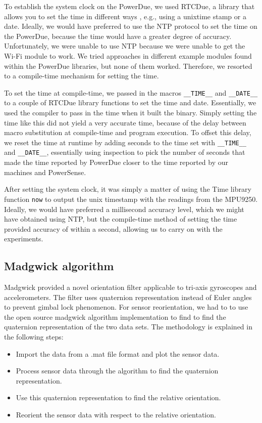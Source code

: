 \documentclass[journal]{IEEEtranTIE}
\begin{document}
To establish the system clock on the PowerDue, we used RTCDue, a library that
allows you to set the time in different ways \cite{RTCDue}, e.g., using a
unixtime stamp or a date. Ideally, we would have preferred to use the NTP
protocol to set the time on the PowerDue, because the time would have a greater
degree of accuracy. Unfortunately, we were unable to use NTP because we were
unable to get the Wi-Fi module to work. We tried approaches in different example
modules found within the PowerDue libraries, but none of them worked. Therefore,
we resorted to a compile-time mechanism for setting the time.

To set the time at compile-time, we passed in the macros \texttt{\_\_TIME\_\_}
and \texttt{\_\_DATE\_\_} to a couple of RTCDue library functions to set the
time and date. Essentially, we used the compiler to pass in the time when it
built the binary. Simply setting the time like this did not yield a very
accurate time, because of the delay between macro substitution at compile-time
and program execution. To offset this delay, we reset the time at runtime by
adding seconds to the time set with \texttt{\_\_TIME\_\_} and
\texttt{\_\_DATE\_\_}, essentially using inspection to pick the number of
seconds that made the time reported by PowerDue closer to the time reported by
our machines and PowerSense.

After setting the system clock, it was simply a matter of using the Time library
function \texttt{now} \cite{TimeLib} to output the unix timestamp with the
readings from the MPU9250. Ideally, we would have preferred a millisecond
accuracy level, which we might have obtained using NTP, but the compile-time
method of setting the time provided accuracy of within a second, allowing us to
carry on with the experiments.

\subsection{Madgwick algorithm}

Madgwick provided a novel orientation filter applicable to tri-axis gyroscopes
and accelerometers. The filter uses quaternion representation instead of Euler
angles to prevent gimbal lock phenomenon. For sensor reorientation, we had to to
use the open source madgwick algorithm implementation to find to find the
quaternion representation of the two data sets. The methodology is explained in
the following steps:

\begin{itemize}
\item Import the data from a .mat file format and plot the sensor data.
\item Process sensor data through the algorithm to find the quaternion
      representation.
\item Use this quaternion representation to find the relative orientation.
\item Reorient the sensor data with respect to the relative orientation.
\end{itemize}
\end{document}
